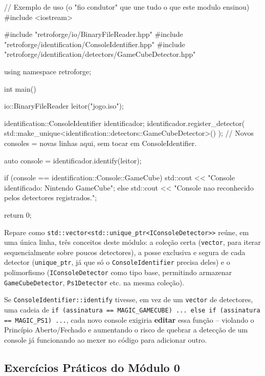 \begin{CaixaCodigo}
// Exemplo de uso (o "fio condutor" que une tudo o que este modulo ensinou)
#include <iostream>

#include "retroforge/io/BinaryFileReader.hpp"
#include "retroforge/identification/ConsoleIdentifier.hpp"
#include "retroforge/identification/detectors/GameCubeDetector.hpp"

using namespace retroforge;

int main() {
    io::BinaryFileReader leitor("jogo.iso");

    identification::ConsoleIdentifier identificador;
    identificador.register_detector(
        std::make_unique<identification::detectors::GameCubeDetector>()
    );
    // Novos consoles = novas linhas aqui, sem tocar em ConsoleIdentifier.

    auto console = identificador.identify(leitor);

    if (console == identification::Console::GameCube) {
        std::cout << "Console identificado: Nintendo GameCube\n";
    } else {
        std::cout << "Console nao reconhecido pelos detectores registrados.\n";
    }

    return 0;
}
\end{CaixaCodigo}

\begin{CaixaInfo}
Repare como \texttt{std::vector<std::unique\_ptr<IConsoleDetector>>} reúne, em uma única linha, três conceitos deste módulo: a coleção certa (\texttt{vector}, para iterar sequencialmente sobre poucos detectores), a posse exclusiva e segura de cada detector (\texttt{unique\_ptr}, já que só o \texttt{ConsoleIdentifier} precisa deles) e o polimorfismo (\texttt{IConsoleDetector} como tipo base, permitindo armazenar \texttt{GameCubeDetector}, \texttt{Ps1Detector} etc. na mesma coleção).
\end{CaixaInfo}

\begin{CaixaAlerta}
Se \texttt{ConsoleIdentifier::identify} tivesse, em vez de um \texttt{vector} de detectores, uma cadeia de \texttt{if (assinatura == MAGIC\_GAMECUBE) ... else if (assinatura == MAGIC\_PS1) ...}, cada novo console exigiria \textbf{editar} essa função -- violando o Princípio Aberto/Fechado e aumentando o risco de quebrar a detecção de um console já funcionando ao mexer no código para adicionar outro.
\end{CaixaAlerta}

\subsection{Exercícios Práticos do Módulo 0}

